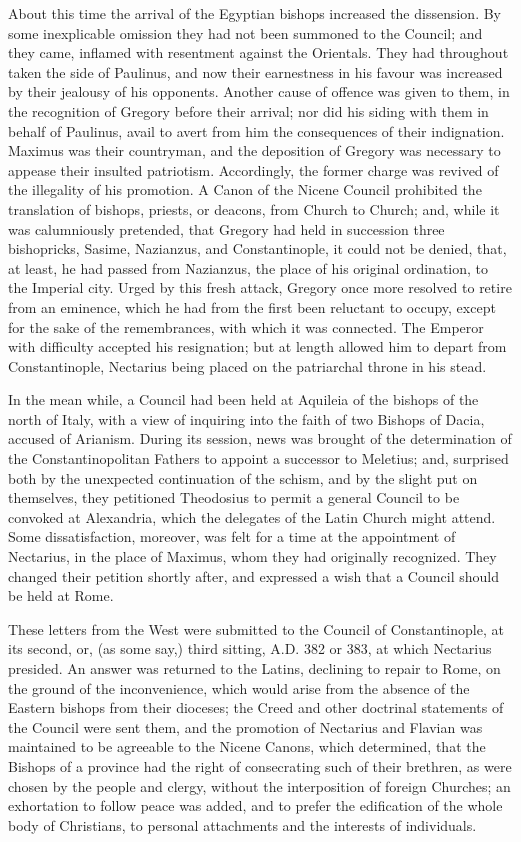 About this time the arrival of the Egyptian bishops increased the
dissension. By some inexplicable omission they had not been summoned
to the Council; and they came, inflamed with resentment against the
Orientals. They had throughout taken the side of Paulinus, and now
their earnestness in his favour was increased by their jealousy of his
opponents. Another cause of offence was given to them, in the
recognition of Gregory before their arrival; nor did his siding with
them in behalf of Paulinus, avail to avert from him the consequences
of their indignation. Maximus was their countryman, and the deposition
of Gregory was necessary to appease their insulted patriotism.
Accordingly, the former charge was revived of the illegality of
his promotion. A Canon of the Nicene Council prohibited the
translation of bishops, priests, or deacons, from Church to Church;
and, while it was calumniously pretended, that Gregory had held in
succession three bishopricks, Sasime, Nazianzus, and Constantinople,
it could not be denied, that, at least, he had passed from Nazianzus,
the place of his original ordination, to the Imperial city. Urged by
this fresh attack, Gregory once more resolved to retire from an
eminence, which he had from the first been reluctant to occupy, except
for the sake of the remembrances, with which it was connected. The
Emperor with difficulty accepted his resignation; but at length
allowed him to depart from Constantinople, Nectarius being placed on
the patriarchal throne in his stead.

In the mean while, a Council had been held at Aquileia of the
bishops of the north of Italy, with a view of inquiring into the faith
of two Bishops of Dacia, accused of Arianism. During its session, news
was brought of the determination of the Constantinopolitan Fathers to
appoint a successor to Meletius; and, surprised both by the unexpected
continuation of the schism, and by the slight put on themselves, they
petitioned Theodosius to permit a general Council to be convoked at
Alexandria, which the delegates of the Latin Church might attend. Some
dissatisfaction, moreover, was felt for a time at the appointment of
Nectarius, in the place of Maximus, whom they had originally
recognized. They changed their petition shortly after, and expressed a
wish that a Council should be held at Rome.

These letters from the West were submitted to the Council of
Constantinople, at its second, or, (as some say,) third sitting, A.D.
382 or 383, at which Nectarius presided. An answer was returned to the
Latins, declining to repair to Rome, on the ground of the
inconvenience, which would arise from the absence of the Eastern
bishops from their dioceses; the Creed and other doctrinal statements
of the Council were sent them, and the promotion of Nectarius and
Flavian was maintained to be agreeable to the Nicene Canons, which
determined, that the Bishops of a province had the right of
consecrating such of their brethren, as were chosen by the people and
clergy, without the interposition of foreign Churches; an exhortation
to follow peace was added, and to prefer the edification of the whole
body of Christians, to personal attachments and the interests of
individuals.

